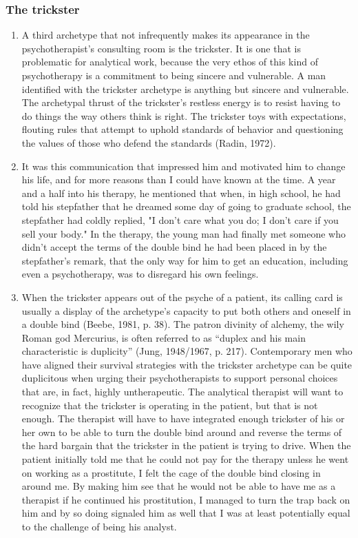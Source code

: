 \subsubsection{The trickster}

\begin{enumerate}

\item {} A third archetype that not infrequently makes its
appearance in the psychotherapist's consulting room is the trickster. It is one
that is problematic for analytical work, because the very ethos of this kind of
psychotherapy is a commitment to being sincere and vulnerable. A man identified
with the trickster archetype is anything but sincere and vulnerable. The
archetypal thrust of the trickster's restless energy is to resist having to do
things the way others think is right. The trickster toys with expectations,
flouting rules that attempt to uphold standards of behavior and questioning the
values of those who defend the standards (Radin, 1972).

\item {} It was this communication that impressed
him and motivated him to change his life, and for more reasons than I could
have known at the time. A year and a half into his therapy, he mentioned that
when, in high school, he had told his stepfather that he dreamed some day of
going to graduate school, the stepfather had coldly replied, "I don't care what
you do; I don't care if you sell your body." In the therapy, the young man had
finally met someone who didn't accept the terms of the double bind he had been
placed in by the stepfather's remark, that the only way for him to get an
education, including even a psychotherapy, was to disregard his own feelings.

\item {} When the trickster appears out of the psyche of
a patient, its calling card is usually a display of the archetype's capacity to
put both others and oneself in a double bind (Beebe, 1981, p. 38). The patron
divinity of alchemy, the wily Roman god Mercurius, is often referred to as
``duplex and his main characteristic is duplicity'' (Jung, 1948/1967, p. 217).
Contemporary men who have aligned their survival strategies with the trickster
archetype can be quite duplicitous when urging their psychotherapists to
support personal choices that are, in fact, highly untherapeutic. The
analytical therapist will want to recognize that the trickster is operating in
the patient, but that is not enough. The therapist will have to have integrated
enough trickster of his or her own to be able to turn the double bind around
and reverse the terms of the hard bargain that the trickster in the patient is
trying to drive. When the patient initially told me that he could not pay for
the therapy unless he went on working as a prostitute, I felt the cage of the
double bind closing in around me. By making him see that he would not be able
to have me as a therapist if he continued his prostitution, I managed to turn
the trap back on him and by so doing signaled him as well that I was at least
potentially equal to the challenge of being his analyst.


\end{enumerate}
